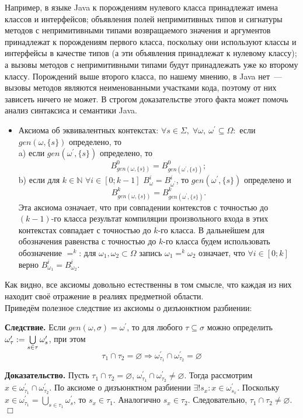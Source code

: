 Например, в языке Java к порождениям нулевого класса принадлежат имена классов и интерфейсов; объявления полей непримитивных типов и сигнатуры методов с непримитивными типами возвращаемого значения и аргументов принадлежат к порождениям первого класса, поскольку они используют классы и интерфейсы в качестве типов (а эти объявления принадлежат к нулевому классу); а вызовы методов с непримитивными типами будут принадлежать уже ко второму классу. Порождений выше второго класса, по нашему мнению, в Java нет~--- вызовы методов являются неименованными участками кода, поэтому от них зависеть ничего не может. В строгом доказательстве этого факта может помочь анализ синтаксиса и семантики Java.

\begin{itemize}	
	\item Аксиома об эквивалентных контекстах: $\forall s \in \Sigma,\; \forall \omega,\: \omega^\prime \subseteq \Omega:$ если $gen(\omega, \{s\})$ определено, то\\
	a) если $gen(\omega^\prime, \{s\})$ определено, то $$B^0_{gen(\omega, \{s\})} = B^0_{gen(\omega^\prime, \{s\})};$$
	b) если для $k \in \mathbb{N}$ $\forall i \in [0; k-1]$ $B^i_{\omega} = B^i_{\omega^\prime}$, то $gen(\omega^\prime, \{s\})$ определено и $$B^k_{gen(\omega, \{s\})} = B^k_{gen(\omega^\prime, \{s\})}.$$
	Эта аксиома означает, что при совпадении контекстов с точностью до $(k-1)$-го класса результат компиляции произвольного входа в этих контекстах совпадает с точностью до $k$-го класса. В дальнейшем для обозначения равенства с точностью до $k$-го класса будем использовать обозначение $=^k$: для $\omega_1, \omega_2 \subset \Omega$ запись $\omega_1 =^k \omega_2$ означает, что $\forall i \in [0; k]$ верно $B^i_{\omega_1} = B^i_{\omega_2}$.
\end{itemize}

Как видно, все аксиомы довольно естественны в том смысле, что каждая из них находит своё отражение в реалиях предметной области.\\

Приведём полезное следствие из аксиомы о дизъюнктном разбиении:

\textbf{Следствие.}
Если $gen(\omega, \sigma) = \omega^\prime$, то для любого $\tau \subseteq \sigma$ можно определить $\omega^\prime_\tau := \bigcup\limits_{s\in\tau}\omega^\prime_s$, при этом
$$\tau_1 \cap \tau_2 = \varnothing \Rightarrow \omega^\prime_{\tau_1} \cap \omega^\prime_{\tau_2} = \varnothing$$

\textbf{Доказательство.} Пусть $\tau_1 \cap \tau_2 = \varnothing$, $\omega^\prime_{\tau_1} \cap \omega^\prime_{\tau_2} \neq \varnothing$. Тогда рассмотрим $x \in \omega^\prime_{\tau_1} \cap \omega^\prime_{\tau_2}$. По аксиоме о дизъюнктном разбиении $\exists ! s_x: x \in \omega^\prime_{s_x}$. Поскольку $x \in \omega^\prime_{\tau_1} = \bigcup\limits_{s\in\tau_1}\omega^\prime_s$, то $s_x \in \tau_1$. Аналогично $s_x \in \tau_2$. Следовательно, $\tau_1 \cap \tau_2 \neq \varnothing$. $\Box$\\

